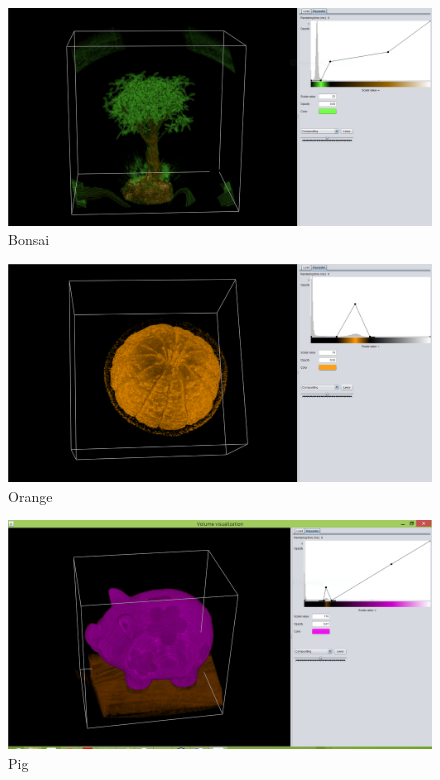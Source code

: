 \documentclass[a4paper,twoside,11pt]{article}
\begin{document}
\begin{figure}[h!]
    \includegraphics[width=\textwidth]{Images/BonsaiCOMP.png}
    \caption{Bonsai}
    \label{fig:BonsaiCOMP}
\end{figure}

\begin{figure}[h!]
    \includegraphics[width=\textwidth]{Images/OrangeCOMP.png}
    \caption{Orange}
    \label{fig:OrangeCOMP}
\end{figure}

\begin{figure}[h!]
    \includegraphics[width=\textwidth]{Images/PigCOMP.png}
    \caption{Pig}
    \label{fig:PigCOMP}
\end{figure} \newpage
\end{document}
